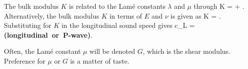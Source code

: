 The bulk modulus $K$ is related to the Lam\'{e} constants 
$\lambda$ and $\mu$ through
\be
K = \lambda + .
\ee
Alternatively, the bulk modulus $K$ in terms of $E$ and $\nu$ is given as
\be
K = .
\ee
Substituting for $K$ in the longitudinal sound speed gives
\be
c_L =  \hspace{1.0cm} \mbox{\bf (longitudinal or P-wave)}.
\ee
\begin{Hremark}
Often, the Lam\'{e} constant $\mu$ will be denoted $G$, which is the 
shear modulus.  Preference for $\mu$ or $G$ is a matter of taste.  
\end{Hremark}














